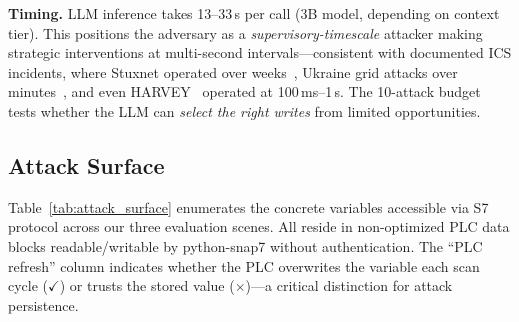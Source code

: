 \textbf{Timing.} LLM inference takes 13--33\,s per call (3B model, depending on context tier). This positions the adversary as a \emph{supervisory-timescale} attacker making strategic interventions at multi-second intervals---consistent with documented ICS incidents, where Stuxnet operated over weeks~\cite{langner2011stuxnet}, Ukraine grid attacks over minutes~\cite{liang2017ukraine}, and even HARVEY~\cite{garcia2017harvey} operated at 100\,ms--1\,s. The 10-attack budget tests whether the LLM can \emph{select the right writes} from limited opportunities.

\subsection{Attack Surface}
\label{sec:threat:attack_surface}

Table~\ref{tab:attack_surface} enumerates the concrete variables accessible via S7 protocol across our three evaluation scenes. All reside in non-optimized PLC data blocks readable/writable by python-snap7 without authentication. The ``PLC refresh'' column indicates whether the PLC overwrites the variable each scan cycle ($\checkmark$) or trusts the stored value ($\times$)---a critical distinction for attack persistence.

